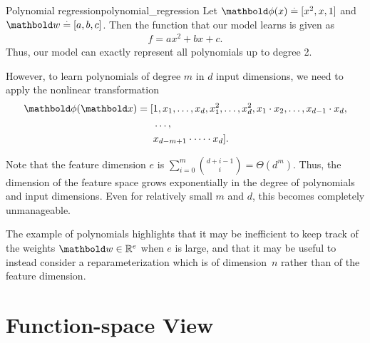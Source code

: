 \begin{ex}{Polynomial regression}{polynomial_regression}
  Let ${\vphi(x) \defeq [x^2, x, 1]}$ and ${\vw \defeq [a, b, c]}$.
  Then the function that our model learns is given as \begin{align*}
    f = a x^2 + b x + c.
  \end{align*}
  Thus, our model can exactly represent all polynomials up to degree 2.

  However, to learn polynomials of degree $m$ in $d$ input dimensions, we need to apply the nonlinear transformation \begin{align*}
    \vphi(\vx) = [&1, x_1, \dots, x_d, x_1^2, \dots, x_d^2, x_1 \cdot x_2, \dots, x_{d-1} \cdot x_d, \\
    &\dots, \\
    &x_{d-m+1} \cdot \dots \cdot x_d].
  \end{align*}

  Note that the feature dimension $e$ is $\sum_{i=0}^m {d+i-1 \choose i} = \Theta(d^m)$.
  Thus, the dimension of the feature space grows exponentially in the degree of polynomials and input dimensions.
  Even for relatively small $m$ and $d$, this becomes completely unmanageable.
\end{ex}

The example of polynomials highlights that it may be inefficient to keep track of the weights $\vw \in \R^e$ when $e$ is large, and that it may be useful to instead consider a reparameterization which is of dimension~$n$ rather than of the feature dimension.

\section{Function-space View}\label{sec:blr:function_space_view}

